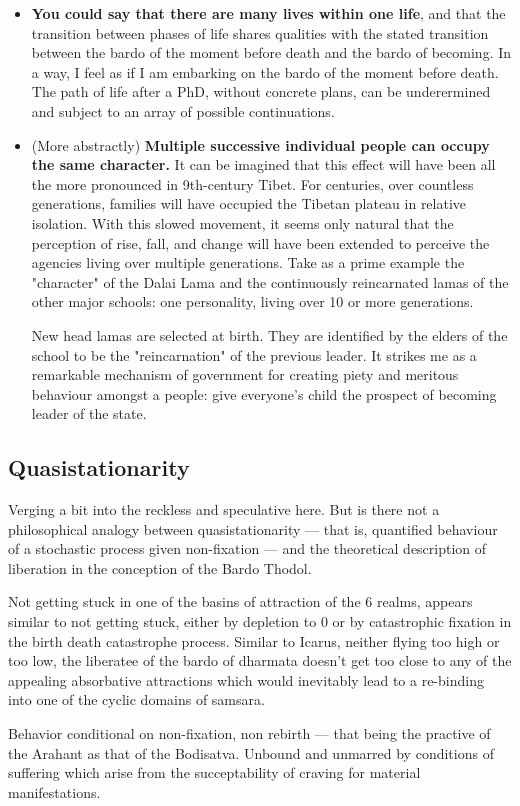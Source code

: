 \begin{itemize} \item \textbf{You could say that there are many lives within one life}, and that the transition between phases of life shares qualities with the stated transition between the bardo of the moment before death and the bardo of becoming. In a way, I feel as if I am embarking on the bardo of the moment before death.  The path of life after a PhD, without concrete plans, can be underermined and subject to an array of possible continuations. 

\item (More abstractly) \textbf{Multiple successive individual people can occupy the same character.} It can be imagined that this effect will have been all the more pronounced in 9th-century Tibet. For centuries, over countless generations, families will have occupied the Tibetan plateau in relative isolation. With this slowed movement, it seems only natural that the perception of rise, fall, and change will have been extended to perceive the agencies living over multiple generations. Take as a prime example the "character" of the Dalai Lama and the continuously reincarnated lamas of the other major schools: one personality, living over 10 or more generations.

New head lamas are selected at birth. They are identified by the elders of the school to be the "reincarnation" of the previous leader. It strikes me as a remarkable mechanism of government for creating piety and meritous behaviour amongst a people: give everyone's child the prospect of becoming leader of the state.

\end{itemize}

\subsection*{Quasistationarity} 

Verging a bit into the reckless and speculative here.  But is there not a philosophical analogy between quasistationarity --- that is,  quantified behaviour of a stochastic process given non-fixation --- and the theoretical description of liberation in the conception of the Bardo Thodol. \par 
Not getting stuck in one of the basins of attraction of the 6 realms, appears similar to not getting stuck, either by depletion to 0 or by catastrophic fixation in the birth death catastrophe process.  Similar to Icarus, neither flying too high or too low,  the liberatee of the bardo of dharmata doesn't get too close to any of the appealing absorbative attractions which would inevitably lead to a re-binding into one of the cyclic domains of samsara.  \par 
Behavior conditional on non-fixation, non rebirth --- that being the practive of the Arahant as that of the Bodisatva.  Unbound and unmarred by conditions of suffering which arise from the succeptability of craving for material manifestations. \par 



